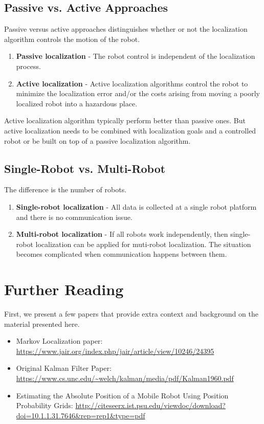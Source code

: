 \documentclass[twoside]{article}
\begin{document}
\subsection{Passive vs. Active Approaches}
Passive versus active approaches distinguishes whether or not the localization algorithm controls the motion of the robot.
\begin{enumerate}
    \item \textbf{Passive localization} - The robot control is independent of the localization process.
    \item \textbf{Active localization} - Active localization algorithms control the robot to minimize the localization error and/or the costs arising from moving a poorly localized robot into a hazardous place.
\end{enumerate}

Active localization algorithm typically perform better than passive ones. But active localization needs to be combined with localization goals and a controlled robot or be built on top of a passive localization algorithm.

\subsection{Single-Robot vs. Multi-Robot}
The difference is the number of robots.
\begin{enumerate}
    \item \textbf{Single-robot localization} - All data is collected at a single robot platform and there is no communication issue.
    \item \textbf{Multi-robot localization} - If all robots work independently, then single-robot localization can be applied for muti-robot localization. The situation becomes complicated when communication happens between them.
\end{enumerate}

\section{Further Reading}
First, we present a few papers that provide extra context and background on the material presented here.
\begin{itemize}
    \item Markov Localization paper: \url{https://www.jair.org/index.php/jair/article/view/10246/24395}
    \item Original Kalman Filter Paper: \url{https://www.cs.unc.edu/~welch/kalman/media/pdf/Kalman1960.pdf}
    \item Estimating the Absolute Position of a Mobile Robot Using Position Probability Grids: \url{http://citeseerx.ist.psu.edu/viewdoc/download?doi=10.1.1.31.7646&rep=rep1&type=pdf}
\end{itemize}
\end{document}

